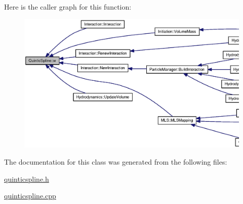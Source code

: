 Here is the caller graph for this function:\nopagebreak
\begin{figure}[H]
\begin{center}
\leavevmode
\includegraphics[width=420pt]{classQuinticSpline_021acaeb55230bf10cf3a2c634381088_icgraph}
\end{center}
\end{figure}


The documentation for this class was generated from the following files:\begin{CompactItemize}
\item 
\hyperlink{quinticspline_8h}{quinticspline.h}\item 
\hyperlink{quinticspline_8cpp}{quinticspline.cpp}\end{CompactItemize}
